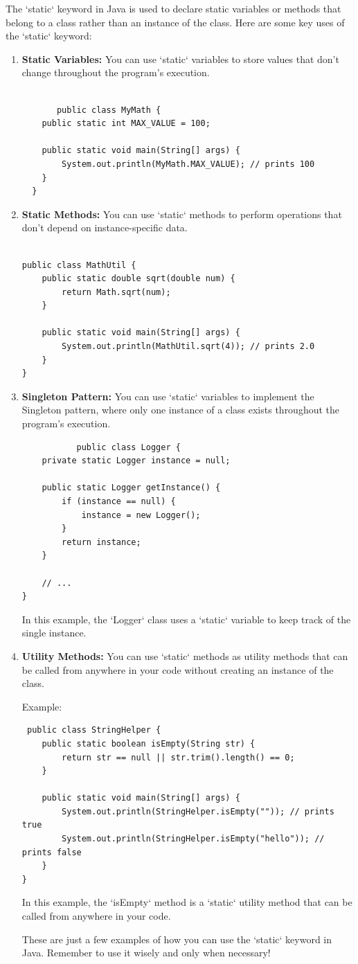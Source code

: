 \documentclass{book}
\begin{document}
The `static` keyword in Java is used to declare static variables or methods that belong to a class rather than an instance of the class. Here are
some key uses of the `static` keyword:
\begin{enumerate}
	\item  \textbf{Static Variables:} You can use `static` variables to store values that don't change throughout the program's execution.
	      \begin{verbatim}

       public class MyMath {
    public static int MAX_VALUE = 100;

    public static void main(String[] args) {
        System.out.println(MyMath.MAX_VALUE); // prints 100
    }
  }
    \end{verbatim}
	\item  \textbf{Static Methods:} You can use `static` methods to perform operations that don't depend on instance-specific data.
	      \begin{verbatim}
       
public class MathUtil {
    public static double sqrt(double num) {
        return Math.sqrt(num);
    }

    public static void main(String[] args) {
        System.out.println(MathUtil.sqrt(4)); // prints 2.0
    }
}
    \end{verbatim}
	\item\textbf{Singleton Pattern: }You can use `static` variables to implement the Singleton pattern, where only one instance of a class exists throughout
	      the program's execution.
	      \begin{verbatim}
           public class Logger {
    private static Logger instance = null;

    public static Logger getInstance() {
        if (instance == null) {
            instance = new Logger();
        }
        return instance;
    }

    // ...
}
        \end{verbatim}
	      In this example, the `Logger` class uses a `static` variable to keep track of the single instance.
	\item \textbf{Utility Methods: } You can use `static` methods as utility methods that can be called from anywhere in your code without creating an instance
	      of the class.

	      Example:
	      \begin{verbatim}
 public class StringHelper {
    public static boolean isEmpty(String str) {
        return str == null || str.trim().length() == 0;
    }

    public static void main(String[] args) {
        System.out.println(StringHelper.isEmpty("")); // prints true
        System.out.println(StringHelper.isEmpty("hello")); // prints false
    }
}          
        \end{verbatim}
	      In this example, the `isEmpty` method is a `static` utility method that can be called from anywhere in your code.

	      These are just a few examples of how you can use the `static` keyword in Java. Remember to use it wisely and only when necessary!
\end{enumerate}
\end{document}
